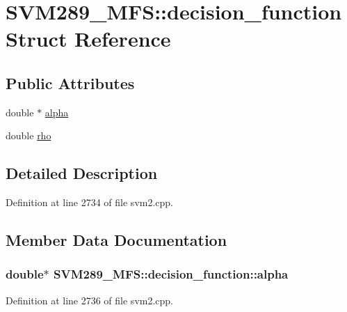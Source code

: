 \hypertarget{struct_s_v_m289___m_f_s_1_1decision__function}{}\section{S\+V\+M289\+\_\+\+M\+FS\+:\+:decision\+\_\+function Struct Reference}
\label{struct_s_v_m289___m_f_s_1_1decision__function}
\subsection*{Public Attributes}
\begin{DoxyCompactItemize}
\item 
double $\ast$ \hyperlink{struct_s_v_m289___m_f_s_1_1decision__function_abd57f8b2908e6b5d882f24bf13fd7963}{alpha}
\item 
double \hyperlink{struct_s_v_m289___m_f_s_1_1decision__function_a6d758b106c06798b94311f4a6c498519}{rho}
\end{DoxyCompactItemize}


\subsection{Detailed Description}


Definition at line 2734 of file svm2.\+cpp.



\subsection{Member Data Documentation}
\subsubsection[{\texorpdfstring{alpha}{alpha}}]{\setlength{\rightskip}{0pt plus 5cm}double$\ast$ S\+V\+M289\+\_\+\+M\+F\+S\+::decision\+\_\+function\+::alpha}\hypertarget{struct_s_v_m289___m_f_s_1_1decision__function_abd57f8b2908e6b5d882f24bf13fd7963}{}\label{struct_s_v_m289___m_f_s_1_1decision__function_abd57f8b2908e6b5d882f24bf13fd7963}


Definition at line 2736 of file svm2.\+cpp.



